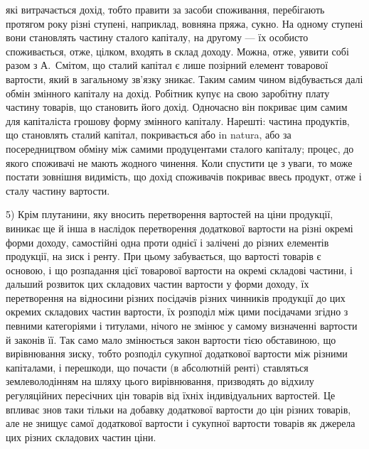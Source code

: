 \parcont{}  %
які витрачається дохід, тобто правити за засоби споживання, перебігають протягом
року різні ступені, наприклад, вовняна пряжа, сукно. На одному ступені
вони становлять частину сталого капіталу, на другому — їх особисто споживається,
отже, цілком, входять в склад доходу. Можна, отже, уявити собі разом
з А.~Смітом, що сталий капітал є лише позірний елемент товарової вартости,
який в загальному зв’язку зникає. Таким самим чином відбувається далі обмін
змінного капіталу на дохід. Робітник купує на свою заробітну плату частину
товарів, що становить його дохід. Одночасно він покриває цим самим для капіталіста
грошову форму змінного капіталу. Нарешті: частина продуктів, що становлять
сталий капітал, покривається або in natura, або за посередництвом обміну
між самими продуцентами сталого капіталу; процес, до якого споживачі
не мають жодного чинення. Коли спустити це з уваги, то може постати зовнішня
видимість, що дохід споживачів покриває ввесь продукт, отже і сталу частину
вартости.

5) Крім плутанини, яку вносить перетворення вартостей на ціни продукції,
виникає ще й інша в наслідок перетворення додаткової вартости на різні окремі
форми доходу, самостійні одна проти однієї і залічені до різних елементів продукції,
на зиск і ренту. При цьому забувається, що вартості товарів є основою, і що
розпадання цієї товарової вартости на окремі складові частини, і дальший розвиток
цих складових частин вартости у форми доходу, їх перетворення на відносини
різних посідачів різних чинників продукції до цих окремих складових
частин вартости, їх розподіл між цими посідачами згідно з певними категоріями
і титулами, нічого не змінює у самому визначенні вартости й законів її.
Так само мало змінюється закон вартости тією обставиною, що вирівнювання
зиску, тобто розподіл сукупної додаткової вартости між різними капіталами, і
перешкоди, що почасти (в абсолютній ренті) ставляться землеволодінням на
шляху цього вирівнювання, призводять до відхилу регуляційних пересічних цін
товарів від їхніх індивідуальних вартостей. Це впливає знов таки тільки на
добавку додаткової вартости до цін різних товарів, але не знищує самої додаткової
вартости і сукупної вартости товарів як джерела цих різних складових
частин ціни.

